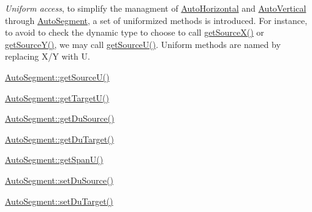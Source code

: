 \begin{DoxyItemize}
\item {\itshape Uniform access}, to simplify the managment of \hyperlink{classKatabatic_1_1AutoHorizontal}{Auto\-Horizontal} and \hyperlink{classKatabatic_1_1AutoVertical}{Auto\-Vertical} through \hyperlink{classKatabatic_1_1AutoSegment}{Auto\-Segment}, a set of uniformized methods is introduced. For instance, to avoid to check the dynamic type to choose to call \hyperlink{classKatabatic_1_1AutoSegment_ab160396298a1a51b9988ad246dc2a47f}{get\-Source\-X()} or \hyperlink{classKatabatic_1_1AutoSegment_a232af840ba84faa0b1411ba1c3a418f1}{get\-Source\-Y()}, we may call \hyperlink{classKatabatic_1_1AutoSegment_aeaa1543880686755e389c4807128428f}{get\-Source\-U()}. Uniform methods are named by replacing {\ttfamily X/\-Y} with {\ttfamily U}. 
\begin{DoxyItemize}
\item \hyperlink{classKatabatic_1_1AutoSegment_aeaa1543880686755e389c4807128428f}{Auto\-Segment\-::get\-Source\-U()} 
\item \hyperlink{classKatabatic_1_1AutoSegment_a828fef2716cc9c370d6d170bb96556ec}{Auto\-Segment\-::get\-Target\-U()} 
\item \hyperlink{classKatabatic_1_1AutoSegment_ab4881df67bd8f036d0199ed6540fe774}{Auto\-Segment\-::get\-Du\-Source()} 
\item \hyperlink{classKatabatic_1_1AutoSegment_a0644d656eedc71dba2fb3c6c0d83ed3f}{Auto\-Segment\-::get\-Du\-Target()} 
\item \hyperlink{classKatabatic_1_1AutoSegment_a248eb2fbb06e3286650b28567d495f0b}{Auto\-Segment\-::get\-Span\-U()} 
\item \hyperlink{classKatabatic_1_1AutoSegment_aaf60d18ab6d951a34a3d06959ce2e76f}{Auto\-Segment\-::set\-Du\-Source()} 
\item \hyperlink{classKatabatic_1_1AutoSegment_a246756d4c8b3e094a0a9d6de3c2109ff}{Auto\-Segment\-::set\-Du\-Target()} 
\end{DoxyItemize}
\end{DoxyItemize}

